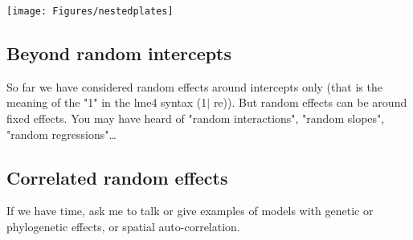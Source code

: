 \documentclass[12pt,a4paper]{scrartcl}\usepackage[]{graphicx}\usepackage[]{color}
\begin{document}
\begin{Exercise}[difficulty=1, title={PCR plate}]
\texttt{[image: Figures/nestedplates]}
\end{Exercise}

\subsection{Beyond random intercepts}

So far we have considered random effects around intercepts only (that is the meaning of the "1" in the lme4 syntax (1$\mid$ re)). But random effects can be around fixed effects. You may have heard of "random interactions", "random slopes", "random regressions"\dots


\subsection{Correlated random effects}

If we have time, ask me to talk or give examples of models with genetic or phylogenetic effects, or spatial auto-correlation.
\end{document}
